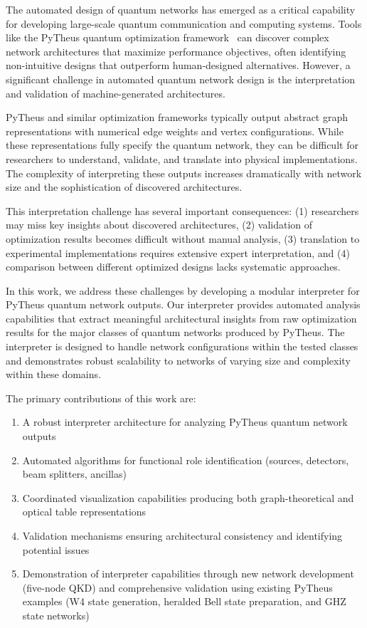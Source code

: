 \documentclass[11pt,a4paper]{article}
\begin{document}
The automated design of quantum networks has emerged as a critical capability for developing large-scale quantum communication and computing systems. Tools like the PyTheus quantum optimization framework~\cite{pytheus_reference} can discover complex network architectures that maximize performance objectives, often identifying non-intuitive designs that outperform human-designed alternatives. However, a significant challenge in automated quantum network design is the interpretation and validation of machine-generated architectures.

PyTheus and similar optimization frameworks typically output abstract graph representations with numerical edge weights and vertex configurations. While these representations fully specify the quantum network, they can be difficult for researchers to understand, validate, and translate into physical implementations. The complexity of interpreting these outputs increases dramatically with network size and the sophistication of discovered architectures.

This interpretation challenge has several important consequences: (1) researchers may miss key insights about discovered architectures, (2) validation of optimization results becomes difficult without manual analysis, (3) translation to experimental implementations requires extensive expert interpretation, and (4) comparison between different optimized designs lacks systematic approaches.

In this work, we address these challenges by developing a modular interpreter for PyTheus quantum network outputs. Our interpreter provides automated analysis capabilities that extract meaningful architectural insights from raw optimization results for the major classes of quantum networks produced by PyTheus. The interpreter is designed to handle network configurations within the tested classes and demonstrates robust scalability to networks of varying size and complexity within these domains.

The primary contributions of this work are:
\begin{enumerate}
\item A robust interpreter architecture for analyzing PyTheus quantum network outputs
\item Automated algorithms for functional role identification (sources, detectors, beam splitters, ancillas)
\item Coordinated visualization capabilities producing both graph-theoretical and optical table representations
\item Validation mechanisms ensuring architectural consistency and identifying potential issues
\item Demonstration of interpreter capabilities through new network development (five-node QKD) and comprehensive validation using existing PyTheus examples (W4 state generation, heralded Bell state preparation, and GHZ state networks)
\end{enumerate}
\end{document}
